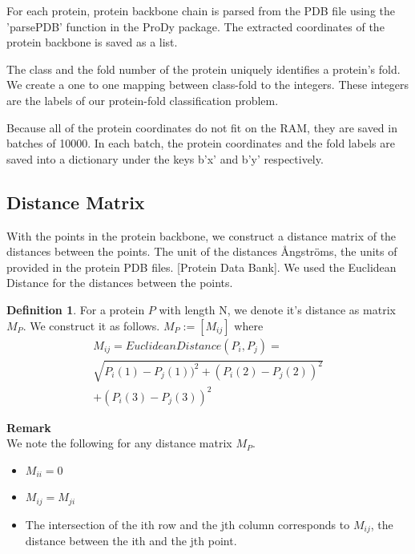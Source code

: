\documentclass[12pt, a4paper, twocolumn, fullpage]{article}
\theoremstyle{plain}
\theoremstyle{definition}
\newtheorem{defn}{Definition}[section]
\theoremstyle{remark}
\begin{document}
For each protein, protein backbone chain is parsed from the PDB file using the 'parsePDB' function in the ProDy package. The extracted coordinates of the protein backbone is saved as a list. 

The class and the fold number of the protein uniquely identifies a protein's fold. We create a one to one mapping between class-fold to the integers. These integers are the labels of our protein-fold classification problem.

Because all of the protein coordinates do not fit on the RAM, they are saved in batches of 10000. In each batch, the protein coordinates and the fold labels are saved into a dictionary under the keys b'x' and b'y' respectively.

\subsection{ Distance Matrix}
With the points in the protein backbone, we construct a distance matrix of the distances between the points. The unit of the distances Ångströms, the units of provided in the protein PDB files. [Protein Data Bank]. We used the Euclidean Distance for the distances between the points.

    
\begin{defn}
    For a protein $P$ with length N, we denote it's distance as matrix $M_{P}$.
    We construct it as follows.
    $ M_{P} := [M_{ij}] $ where 
    \begin{multline*}
    M_{ij} = Euclidean Distance(P_i, P_j) = \\ \sqrt{P_i(1)-P_j(1))^2+(P_i(2)-P_j(2))^2} \\ +(P_i(3)-P_j(3))^2
    \end{multline*}
\end{defn}

\noindent
\textbf{Remark}
\\
    We note the following for any distance matrix $M_{P}$.
    \begin{itemize}
        \item $M_{ii} = 0$
        \item $M_{ij} = M_{ji}$
        \item The intersection of the ith row and the jth column corresponds to $M_{ij}$, the distance between the ith and the jth point.
    \end{itemize}
    
\end{document}
